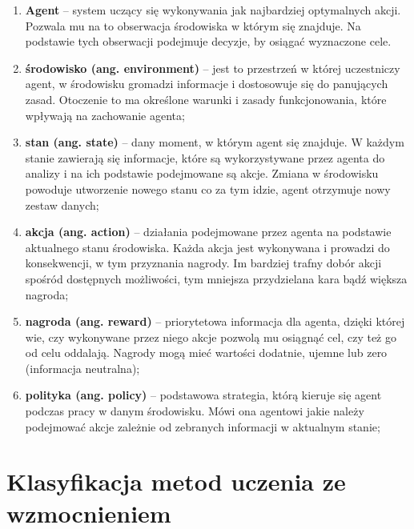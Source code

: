 \documentclass{iiuwb}
\begin{document}
\begin{enumerate}
    \item \textbf{Agent} – system uczący się wykonywania jak najbardziej optymalnych akcji. Pozwala mu na to obserwacja środowiska w którym się znajduje. Na podstawie tych obserwacji podejmuje decyzje, by osiągać wyznaczone cele.
    \item \textbf{środowisko (ang. environment)} – jest to przestrzeń w której uczestniczy agent, w środowisku gromadzi informacje i dostosowuje się do panujących zasad. Otoczenie to ma określone warunki i zasady funkcjonowania, które wpływają na zachowanie agenta;
    \item \textbf{stan (ang. state)} – dany moment, w którym agent się znajduje. W każdym stanie zawierają się informacje, które są wykorzystywane przez agenta do analizy i na ich podstawie podejmowane są akcje. Zmiana w środowisku powoduje utworzenie nowego stanu co za tym idzie, agent otrzymuje nowy zestaw danych;
    \item \textbf{akcja (ang. action)} – działania podejmowane przez agenta na podstawie aktualnego stanu środowiska. Każda akcja jest wykonywana i prowadzi do konsekwencji, w tym przyznania nagrody. Im bardziej trafny dobór akcji spośród dostępnych możliwości, tym mniejsza przydzielana kara bądź większa nagroda;
    \item \textbf{nagroda (ang. reward)} – priorytetowa informacja dla agenta, dzięki której wie, czy wykonywane przez niego akcje pozwolą mu osiągnąć cel, czy też go od celu oddalają. Nagrody mogą mieć wartości dodatnie, ujemne lub zero (informacja neutralna);
    \item \textbf{polityka (ang. policy)} – podstawowa strategia, którą kieruje się agent podczas pracy w danym środowisku. Mówi ona agentowi jakie należy podejmować akcje zależnie od zebranych informacji w aktualnym stanie;
\end{enumerate}

\section{Klasyfikacja metod uczenia ze wzmocnieniem}
\end{document}
